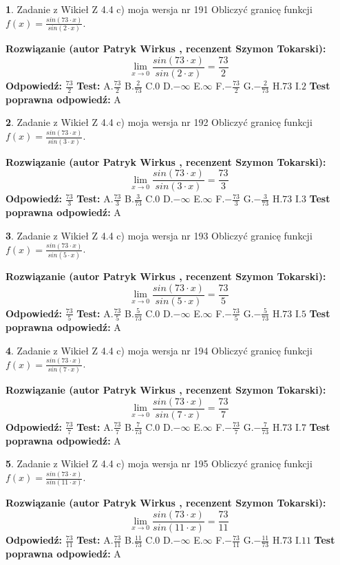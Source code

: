 \documentclass[12pt, a4paper]{article}
\theoremstyle{definition} %
\newtheorem{zad}{}
\newcommand{\zadStart}[1]{\begin{zad}#1\newline}
\newcommand{\zadStop}{\end{zad}}
\newcommand{\rozwStart}[2]{\noindent \textbf{Rozwiązanie (autor #1 , recenzent #2): }\newline}
\newcommand{\rozwStop}{\newline}
\newcommand{\odpStart}{\noindent \textbf{Odpowiedź:}\newline}
\newcommand{\odpStop}{\newline}
\newcommand{\testStart}{\noindent \textbf{Test:}\newline}
\newcommand{\testStop}{\newline}
\newcommand{\kluczStart}{\noindent \textbf{Test poprawna odpowiedź:}\newline}
\newcommand{\kluczStop}{\newline}
\begin{document}
\zadStart{Zadanie z Wikieł Z 4.4 c) moja wersja nr 191}
Obliczyć granicę funkcji $f(x)=\frac{sin(73\cdot x)}{sin(2\cdot x)}$.
\zadStop
\rozwStart{Patryk Wirkus}{Szymon Tokarski}
$$\lim\limits_{x\to 0}\frac{sin(73\cdot x)}{sin(2\cdot x)}=
\frac{73}{2}$$
\rozwStop
\odpStart
$\frac{73}{2}$
\odpStop
\testStart
A.$\frac{73}{2}$
B.$\frac{2}{73}$
C.$0$
D.$-\infty$
E.$\infty$
F.$-\frac{73}{2}$
G.$-\frac{2}{73}$
H.$73$
I.$2$
\testStop
\kluczStart
A
\kluczStop



\zadStart{Zadanie z Wikieł Z 4.4 c) moja wersja nr 192}
Obliczyć granicę funkcji $f(x)=\frac{sin(73\cdot x)}{sin(3\cdot x)}$.
\zadStop
\rozwStart{Patryk Wirkus}{Szymon Tokarski}
$$\lim\limits_{x\to 0}\frac{sin(73\cdot x)}{sin(3\cdot x)}=
\frac{73}{3}$$
\rozwStop
\odpStart
$\frac{73}{3}$
\odpStop
\testStart
A.$\frac{73}{3}$
B.$\frac{3}{73}$
C.$0$
D.$-\infty$
E.$\infty$
F.$-\frac{73}{3}$
G.$-\frac{3}{73}$
H.$73$
I.$3$
\testStop
\kluczStart
A
\kluczStop



\zadStart{Zadanie z Wikieł Z 4.4 c) moja wersja nr 193}
Obliczyć granicę funkcji $f(x)=\frac{sin(73\cdot x)}{sin(5\cdot x)}$.
\zadStop
\rozwStart{Patryk Wirkus}{Szymon Tokarski}
$$\lim\limits_{x\to 0}\frac{sin(73\cdot x)}{sin(5\cdot x)}=
\frac{73}{5}$$
\rozwStop
\odpStart
$\frac{73}{5}$
\odpStop
\testStart
A.$\frac{73}{5}$
B.$\frac{5}{73}$
C.$0$
D.$-\infty$
E.$\infty$
F.$-\frac{73}{5}$
G.$-\frac{5}{73}$
H.$73$
I.$5$
\testStop
\kluczStart
A
\kluczStop



\zadStart{Zadanie z Wikieł Z 4.4 c) moja wersja nr 194}
Obliczyć granicę funkcji $f(x)=\frac{sin(73\cdot x)}{sin(7\cdot x)}$.
\zadStop
\rozwStart{Patryk Wirkus}{Szymon Tokarski}
$$\lim\limits_{x\to 0}\frac{sin(73\cdot x)}{sin(7\cdot x)}=
\frac{73}{7}$$
\rozwStop
\odpStart
$\frac{73}{7}$
\odpStop
\testStart
A.$\frac{73}{7}$
B.$\frac{7}{73}$
C.$0$
D.$-\infty$
E.$\infty$
F.$-\frac{73}{7}$
G.$-\frac{7}{73}$
H.$73$
I.$7$
\testStop
\kluczStart
A
\kluczStop



\zadStart{Zadanie z Wikieł Z 4.4 c) moja wersja nr 195}
Obliczyć granicę funkcji $f(x)=\frac{sin(73\cdot x)}{sin(11\cdot x)}$.
\zadStop
\rozwStart{Patryk Wirkus}{Szymon Tokarski}
$$\lim\limits_{x\to 0}\frac{sin(73\cdot x)}{sin(11\cdot x)}=
\frac{73}{11}$$
\rozwStop
\odpStart
$\frac{73}{11}$
\odpStop
\testStart
A.$\frac{73}{11}$
B.$\frac{11}{73}$
C.$0$
D.$-\infty$
E.$\infty$
F.$-\frac{73}{11}$
G.$-\frac{11}{73}$
H.$73$
I.$11$
\testStop
\kluczStart
A
\kluczStop
\end{document}
